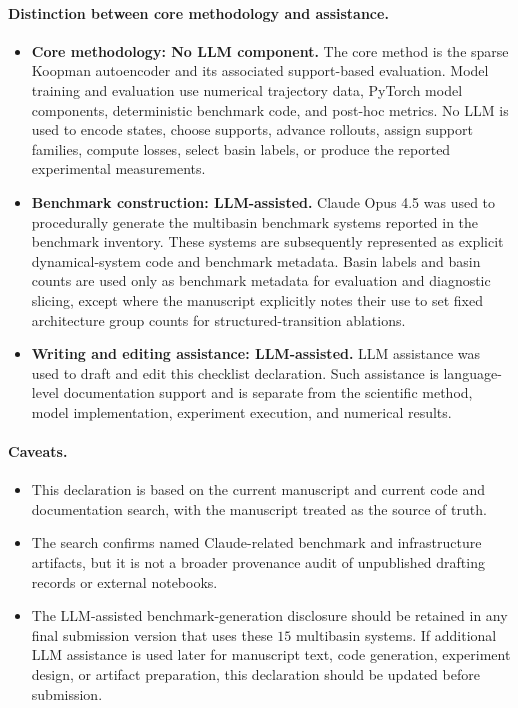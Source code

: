 \paragraph{Distinction between core methodology and assistance.}
\begin{itemize}
  \item \textbf{Core methodology: No LLM component.}
  The core method is the sparse Koopman autoencoder and its associated
  support-based evaluation. Model training and evaluation use numerical
  trajectory data, PyTorch model components, deterministic benchmark code, and
  post-hoc metrics. No LLM is used to encode states, choose supports, advance
  rollouts, assign support families, compute losses, select basin labels, or
  produce the reported experimental measurements.

  \item \textbf{Benchmark construction: LLM-assisted.}
  Claude Opus 4.5 was used to procedurally generate the multibasin benchmark
  systems reported in the benchmark inventory. These systems are subsequently
  represented as explicit dynamical-system code and benchmark metadata. Basin
  labels and basin counts are used only as benchmark metadata for evaluation and
  diagnostic slicing, except where the manuscript explicitly notes their use to
  set fixed architecture group counts for structured-transition ablations.

  \item \textbf{Writing and editing assistance: LLM-assisted.}
  LLM assistance was used to draft and edit this checklist declaration. Such
  assistance is language-level documentation support and is separate from the
  scientific method, model implementation, experiment execution, and numerical
  results.
\end{itemize}

\paragraph{Caveats.}
\begin{itemize}
  \item This declaration is based on the current manuscript and current code and
  documentation search, with the manuscript treated as the source of truth.

  \item The search confirms named Claude-related benchmark and infrastructure
  artifacts, but it is not a broader provenance audit of unpublished drafting
  records or external notebooks.

  \item The LLM-assisted benchmark-generation disclosure should be retained in
  any final submission version that uses these \(15\) multibasin systems. If
  additional LLM assistance is used later for manuscript text, code generation,
  experiment design, or artifact preparation, this declaration should be updated
  before submission.
\end{itemize}
